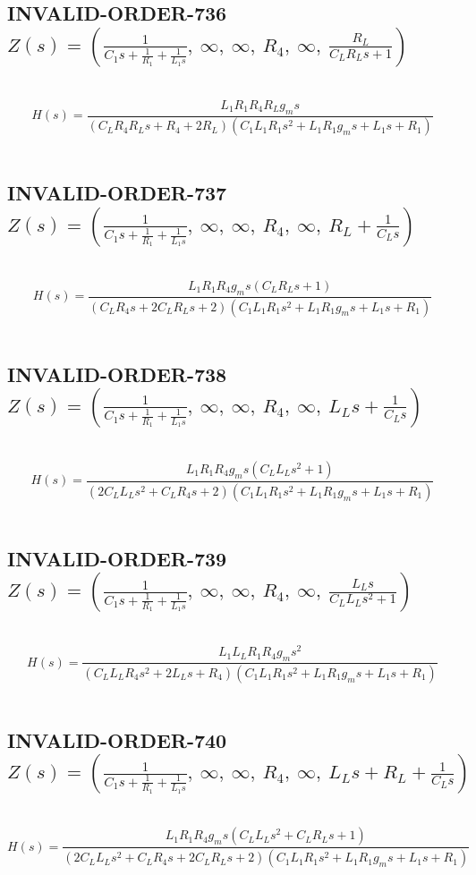 \documentclass{article}
\begin{document}
\subsection{INVALID-ORDER-736 $Z(s) = \left( \frac{1}{C_{1} s + \frac{1}{R_{1}} + \frac{1}{L_{1} s}}, \  \infty, \  \infty, \  R_{4}, \  \infty, \  \frac{R_{L}}{C_{L} R_{L} s + 1}\right)$ } \ 
\textbf{\[H(s) = \frac{L_{1} R_{1} R_{4} R_{L} g_{m} s}{\left(C_{L} R_{4} R_{L} s + R_{4} + 2 R_{L}\right) \left(C_{1} L_{1} R_{1} s^{2} + L_{1} R_{1} g_{m} s + L_{1} s + R_{1}\right)}\] } \ 
\subsection{INVALID-ORDER-737 $Z(s) = \left( \frac{1}{C_{1} s + \frac{1}{R_{1}} + \frac{1}{L_{1} s}}, \  \infty, \  \infty, \  R_{4}, \  \infty, \  R_{L} + \frac{1}{C_{L} s}\right)$ } \ 
\textbf{\[H(s) = \frac{L_{1} R_{1} R_{4} g_{m} s \left(C_{L} R_{L} s + 1\right)}{\left(C_{L} R_{4} s + 2 C_{L} R_{L} s + 2\right) \left(C_{1} L_{1} R_{1} s^{2} + L_{1} R_{1} g_{m} s + L_{1} s + R_{1}\right)}\] } \ 
\subsection{INVALID-ORDER-738 $Z(s) = \left( \frac{1}{C_{1} s + \frac{1}{R_{1}} + \frac{1}{L_{1} s}}, \  \infty, \  \infty, \  R_{4}, \  \infty, \  L_{L} s + \frac{1}{C_{L} s}\right)$ } \ 
\textbf{\[H(s) = \frac{L_{1} R_{1} R_{4} g_{m} s \left(C_{L} L_{L} s^{2} + 1\right)}{\left(2 C_{L} L_{L} s^{2} + C_{L} R_{4} s + 2\right) \left(C_{1} L_{1} R_{1} s^{2} + L_{1} R_{1} g_{m} s + L_{1} s + R_{1}\right)}\] } \ 
\subsection{INVALID-ORDER-739 $Z(s) = \left( \frac{1}{C_{1} s + \frac{1}{R_{1}} + \frac{1}{L_{1} s}}, \  \infty, \  \infty, \  R_{4}, \  \infty, \  \frac{L_{L} s}{C_{L} L_{L} s^{2} + 1}\right)$ } \ 
\textbf{\[H(s) = \frac{L_{1} L_{L} R_{1} R_{4} g_{m} s^{2}}{\left(C_{L} L_{L} R_{4} s^{2} + 2 L_{L} s + R_{4}\right) \left(C_{1} L_{1} R_{1} s^{2} + L_{1} R_{1} g_{m} s + L_{1} s + R_{1}\right)}\] } \ 
\subsection{INVALID-ORDER-740 $Z(s) = \left( \frac{1}{C_{1} s + \frac{1}{R_{1}} + \frac{1}{L_{1} s}}, \  \infty, \  \infty, \  R_{4}, \  \infty, \  L_{L} s + R_{L} + \frac{1}{C_{L} s}\right)$ } \ 
\textbf{\[H(s) = \frac{L_{1} R_{1} R_{4} g_{m} s \left(C_{L} L_{L} s^{2} + C_{L} R_{L} s + 1\right)}{\left(2 C_{L} L_{L} s^{2} + C_{L} R_{4} s + 2 C_{L} R_{L} s + 2\right) \left(C_{1} L_{1} R_{1} s^{2} + L_{1} R_{1} g_{m} s + L_{1} s + R_{1}\right)}\] } \ 
\end{document}
